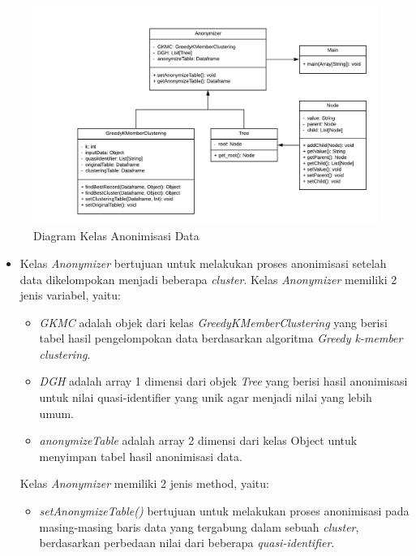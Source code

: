 \documentclass[a4paper,twoside]{article}
\begin{document}
\begin{enumerate}
\begin{figure}[H]
	\centering
	\includegraphics[scale=0.7]{diagram_kelas}
	\caption{Diagram Kelas Anonimisasi Data}
	\label{fig:diagram_kelas}
\end{figure}

\begin{itemize}
\item Kelas \textit{Anonymizer} bertujuan untuk melakukan proses anonimisasi setelah data dikelompokan menjadi beberapa \textit{cluster}. Kelas \textit{Anonymizer} memiliki 2 jenis variabel, yaitu:

\begin{itemize}

\item \textit{GKMC} adalah objek dari kelas \textit{GreedyKMemberClustering} yang berisi tabel hasil pengelompokan data berdasarkan algoritma \textit{Greedy k-member clustering}.

\item \textit{DGH} adalah array 1 dimensi dari objek \textit{Tree} yang berisi hasil anonimisasi untuk nilai quasi-identifier yang unik agar menjadi nilai yang lebih umum.

\item \textit{anonymizeTable} adalah array 2 dimensi dari kelas Object untuk menyimpan tabel hasil anonimisasi data.

\end{itemize}

\noindent Kelas \textit{Anonymizer} memiliki 2 jenis method, yaitu:

\begin{itemize}

\item \textit{setAnonymizeTable()} bertujuan untuk melakukan proses anonimisasi pada masing-masing baris data yang tergabung dalam sebuah \textit{cluster}, berdasarkan perbedaan nilai dari beberapa \textit{quasi-identifier}.


\end{itemize}
\end{itemize}
\end{enumerate}
\end{document}
